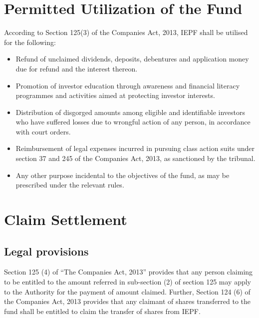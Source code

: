 \documentclass[openany]{book}
\begin{document}
\section{Permitted Utilization of the Fund} \cite{iepfa_annual_reports}
According to Section 125(3) of the Companies Act, 2013, IEPF shall be utilised for the following: 
 
\begin{itemize}
    \item  Refund of unclaimed dividends, deposits, debentures and application money due for refund and the interest thereon. 
    \item  Promotion of investor education through awareness and financial literacy programmes and activities aimed at protecting investor interests. 
    \item Distribution of disgorged amounts among eligible and identifiable investors who have suffered losses due to wrongful action of any person, in accordance with court orders. 
    \item Reimbursement of legal expenses incurred in pursuing class action suits under section 37 and 245 of the Companies Act, 2013, as sanctioned by the tribunal. 
    \item Any other purpose incidental to the objectives of the fund, as may be prescribed under the relevant rules.  
    
\end{itemize}


\section{Claim Settlement} \cite{iepfa_annual_reports}

\subsection{Legal provisions}
Section 125 (4) of ``The Companies Act, 2013'' provides that any person claiming to be entitled to the amount referred in sub-section (2) of section 125 may apply to the Authority for the payment of amount claimed. Further, Section 124 (6) of the Companies Act, 2013 provides that any claimant of shares transferred to the fund shall be entitled to claim the transfer of shares from IEPF.
\end{document}
